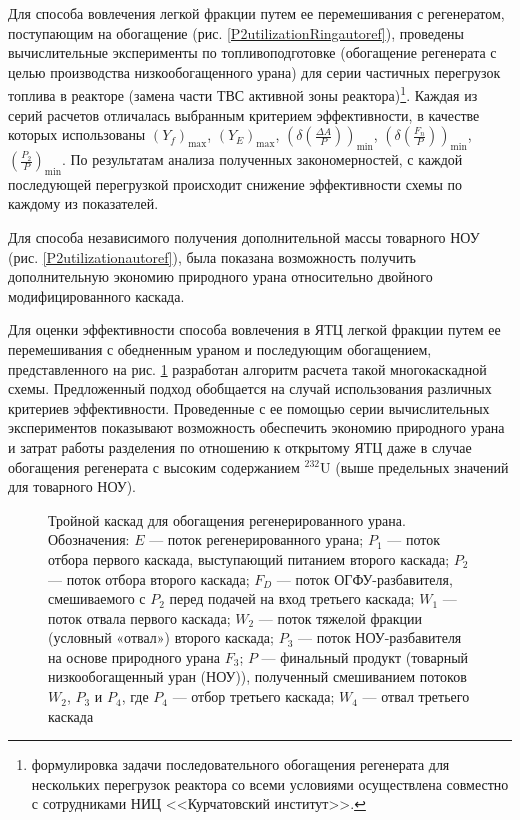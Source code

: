 Для способа вовлечения легкой фракции путем ее перемешивания с регенератом, поступающим на обогащение (рис. \ref{P2utilizationRingautoref}), проведены вычислительные эксперименты по топливоподготовке (обогащение регенерата с целью производства низкообогащенного урана) для серии частичных перегрузок топлива в реакторе (замена части ТВС активной зоны реактора)\footnote{формулировка задачи последовательного обогащения регенерата для нескольких перегрузок реактора со всеми условиями осуществлена совместно с сотрудниками НИЦ <<Курчатовский институт>>.}. Каждая из серий расчетов отличалась выбранным критерием эффективности, в качестве которых использованы $(Y_f)_\text{max}$, $(Y_{E})_\text{max}$, $(\delta(\frac{\Delta A}{P}))_\text{min}$, $(\delta(\frac{F_n}{P}))_\text{min}$, $(\frac{P_2}{P})_\text{min}$. По результатам анализа полученных закономерностей, с каждой последующей перегрузкой происходит снижение эффективности схемы по каждому из показателей.

Для способа независимого получения дополнительной массы товарного НОУ (рис. \ref{P2utilizationautoref}), была показана возможность получить дополнительную экономию природного урана относительно двойного модифицированного каскада.

Для оценки эффективности способа вовлечения в ЯТЦ легкой фракции путем ее перемешивания с обедненным ураном и последующим обогащением, представленного на рис. \ref{p2_withDepU} разработан алгоритм расчета такой многокаскадной схемы. Предложенный подход обобщается на случай использования различных критериев эффективности. Проведенные с ее помощью серии вычислительных экспериментов показывают возможность обеспечить экономию природного урана и затрат работы разделения по отношению к открытому ЯТЦ даже в случае обогащения регенерата с высоким содержанием $^{232}$U (выше предельных значений для товарного НОУ).

\begin{figure}[ht]
  \caption{Тройной каскад для обогащения регенерированного урана. Обозначения: $E$ --- поток регенерированного урана; $P_1$ --- поток отбора первого каскада, выступающий питанием второго каскада; $P_2$ --- поток отбора второго каскада; $F_{D}$ --- поток ОГФУ-разбавителя, смешиваемого с $P_2$ перед подачей на вход третьего каскада; $W_1$ --- поток отвала первого каскада; $W_2$ --- поток тяжелой фракции (условный «отвал») второго каскада; $P_3$ --- поток НОУ-разбавителя на основе природного урана $F_3$; $P$ --- финальный продукт (товарный низкообогащенный уран (НОУ)), полученный смешиванием потоков $W_2$, $P_3$ и $P_4$, где $P_4$ --- отбор третьего каскада; $W_4$ --- отвал третьего каскада}\label{p2_withDepU}
\end{figure}

